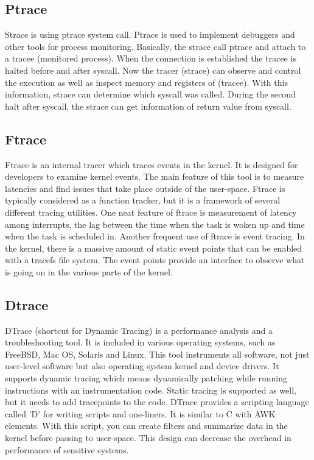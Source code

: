 \subsection{Ptrace}
Strace is using ptrace \cite{ptrace_man} system call.
Ptrace is used to  implement debuggers and other tools for process monitoring.
Basically, the strace call ptrace and attach to a tracee (monitored process).
When the connection is established the tracee is halted before and after syscall.
Now the tracer (strace) can observe and control the execution as well as inspect memory and registers of (tracee).
With this information, strace can determine which syscall was called.
During the second halt after syscall, the strace can get information of return value from syscall.

\subsection{Ftrace}
Ftrace \cite{ftrace_man} is an internal tracer which traces events in the kernel.
It is designed for developers to examine kernel events.
The main feature of this tool is to measure latencies and find issues that take place outside of the user-space.
Ftrace is typically considered as a function tracker,
but it is a framework of several different tracing utilities.
One neat feature of ftrace is measurement of latency among interrupts, the lag between the time when the task is woken up and time when the task is scheduled in.
Another frequent use of ftrace is event tracing.
In the kernel, there is a massive amount of static event points that can be enabled with a tracefs file system.
The event points provide an interface to observe what is going on in the various parts of the kernel.

\subsection{Dtrace}
DTrace \cite{dtrace_man, dtrace_about} (shortcut for Dynamic Tracing) is a performance analysis and a troubleshooting tool.
It is included in various operating systems, such as FreeBSD, Mac OS, Solaris and Linux.
This tool instruments all software, not just user-level software but also operating system kernel and device drivers.
It supports dynamic tracing which means dynamically patching while running instructions with an instrumentation code.
Static tracing is supported as well, but it needs to add tracepoints to the code.
DTrace provides a scripting language called 'D' for writing scripts and one-liners.
It is similar to C with AWK elements.
With this script, you can create filters and summarize data in the kernel before passing to user-space.
This design can decrease the overhead in performance of  sensitive systems.

